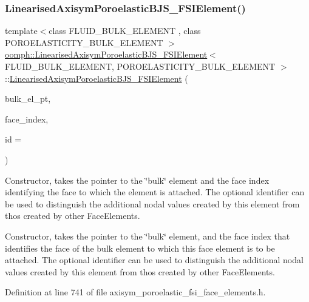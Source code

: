 \subsubsection{\texorpdfstring{Linearised\+Axisym\+Poroelastic\+B\+J\+S\+\_\+\+F\+S\+I\+Element()}{LinearisedAxisymPoroelasticBJS\_FSIElement()}\hspace{0.1cm}{\footnotesize\ttfamily [1/3]}}
{\footnotesize\ttfamily template$<$class F\+L\+U\+I\+D\+\_\+\+B\+U\+L\+K\+\_\+\+E\+L\+E\+M\+E\+NT , class P\+O\+R\+O\+E\+L\+A\+S\+T\+I\+C\+I\+T\+Y\+\_\+\+B\+U\+L\+K\+\_\+\+E\+L\+E\+M\+E\+NT $>$ \\
\hyperlink{classoomph_1_1LinearisedAxisymPoroelasticBJS__FSIElement}{oomph\+::\+Linearised\+Axisym\+Poroelastic\+B\+J\+S\+\_\+\+F\+S\+I\+Element}$<$ F\+L\+U\+I\+D\+\_\+\+B\+U\+L\+K\+\_\+\+E\+L\+E\+M\+E\+NT, P\+O\+R\+O\+E\+L\+A\+S\+T\+I\+C\+I\+T\+Y\+\_\+\+B\+U\+L\+K\+\_\+\+E\+L\+E\+M\+E\+NT $>$\+::\hyperlink{classoomph_1_1LinearisedAxisymPoroelasticBJS__FSIElement}{Linearised\+Axisym\+Poroelastic\+B\+J\+S\+\_\+\+F\+S\+I\+Element} (\begin{DoxyParamCaption}\item[{\hyperlink{classoomph_1_1FiniteElement}{Finite\+Element} $\ast$const \&}]{bulk\+\_\+el\+\_\+pt,  }\item[{const int \&}]{face\+\_\+index,  }\item[{const unsigned \&}]{id = {} }\end{DoxyParamCaption})}



Constructor, takes the pointer to the \char`\"{}bulk\char`\"{} element and the face index identifying the face to which the element is attached. The optional identifier can be used to distinguish the additional nodal values created by this element from thos created by other Face\+Elements. 

Constructor, takes the pointer to the \char`\"{}bulk\char`\"{} element, and the face index that identifies the face of the bulk element to which this face element is to be attached. The optional identifier can be used to distinguish the additional nodal values created by this element from thos created by other Face\+Elements. 

Definition at line 741 of file axisym\+\_\+poroelastic\+\_\+fsi\+\_\+face\+\_\+elements.\+h.



